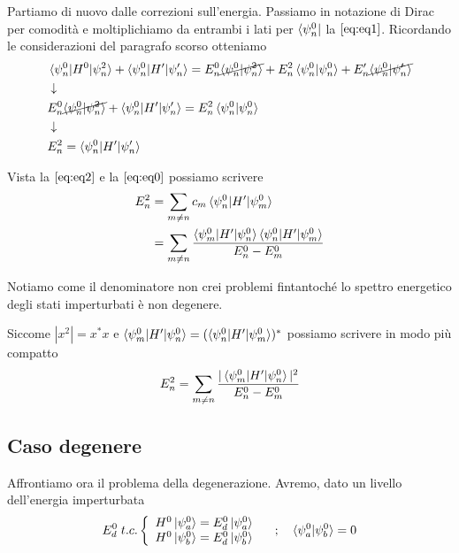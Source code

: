Partiamo di nuovo dalle correzioni sull'energia. Passiamo in notazione di Dirac per comodità e moltiplichiamo da entrambi i lati per $\bra{\psi_n^0}$ la $\eqref{eq:eq1}$. Ricordando le considerazioni del paragrafo scorso otteniamo 
\begin{align}
\label{eq:eq3}
{}& \braket{\psi_n^0|H^0|\psi^2_n} + \braket{\psi_n^0|H'|\psi'_n}=E^0_n\cancel{\braket{\psi_n^0|\psi^2_n}} + E^2_n\braket{\psi_n^0|\psi_n^0} + E_n'\cancel{\braket{\psi_n^0|\psi_n'}}\nonumber \\
& \downarrow \\
& E_n^0\cancel{\braket{\psi_n^0|\psi^2_n}} + \braket{\psi_n^0|H'|\psi'_n}= E^2_n\braket{\psi_n^0|\psi_n^0}\nonumber \\
& \downarrow \\
& E^2_n=\braket{\psi_n^0|H'|\psi'_n}
\end{align}

Vista la $\eqref{eq:eq2}$ e la $\eqref{eq:eq0}$ possiamo scrivere
\begin{align}
E^2_n{}&=\sum_{m\neq n} c_m\braket{\psi_n^0|H'|\psi^0_m} \\
&= \sum_{m\neq n}\frac{\braket{\psi_m^0|H'|\psi_n^0} \braket{\psi_n^0|H'|\psi^0_m}}{E_n^0 - E^0_m}
\end{align}

Notiamo come il denominatore non crei problemi fintantoché lo spettro energetico degli stati imperturbati è non degenere.

Siccome $|x^2|= x^* x$ e $\braket{\psi_m^0|H'|\psi_n^0}= (\braket{\psi_n^0|H'|\psi^0_m})^*$ possiamo scrivere in modo più compatto
\begin{align}
E^2_n= \sum_{m\neq n}\frac{|\braket{\psi_m^0|H'|\psi_n^0}|^2}{E_n^0 - E^0_m}
\end{align}

\newpage

\subsection{Caso degenere}

Affrontiamo ora il problema della degenerazione.
Avremo, dato un livello dell'energia imperturbata
\begin{align}
E_d^0 \; t.c. \left\{\begin{array}{cc}
H^0\ket{\psi^0_a}= E_d^0\ket{\psi^0_a} \\
H^0\ket{\psi^0_b}= E_d^0\ket{\psi^0_b}
\end{array}
\right. \quad ; \quad \braket{\psi_a^0 | \psi_b^0}=0
\end{align}

